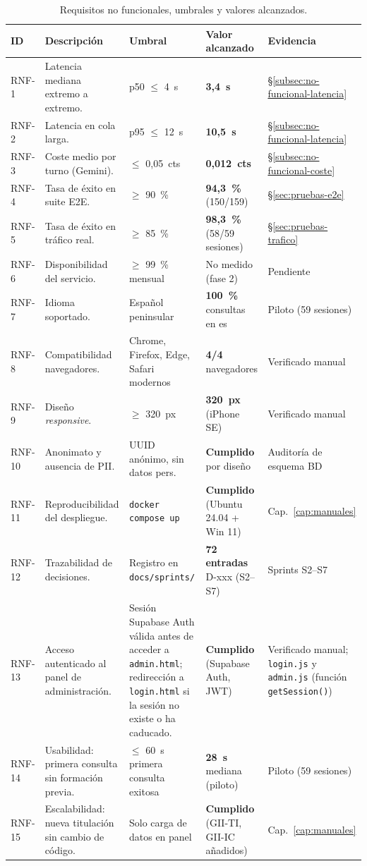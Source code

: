 \begin{table}[hbtp]
\centering
\small
\caption{Requisitos no funcionales, umbrales y valores alcanzados.}\label{tab:rnf}
\begin{tabular}{|p{1.0cm}|p{3.6cm}|p{3.2cm}|p{2.2cm}|p{2.4cm}|}
\hline
\textbf{ID} & \textbf{Descripción} & \textbf{Umbral} & \textbf{Valor alcanzado} & \textbf{Evidencia} \\ \hline
RNF-1 & Latencia mediana extremo a extremo. & p50 $\leq$ 4~s & \textbf{3,4~s} & \S\ref{subsec:no-funcional-latencia} \\ \hline
RNF-2 & Latencia en cola larga. & p95 $\leq$ 12~s & \textbf{10,5~s} & \S\ref{subsec:no-funcional-latencia} \\ \hline
RNF-3 & Coste medio por turno (Gemini). & $\leq$ 0,05~cts & \textbf{0,012~cts} & \S\ref{subsec:no-funcional-coste} \\ \hline
RNF-4 & Tasa de éxito en suite E2E. & $\geq$ 90~\% & \textbf{94,3~\%} (150/159) & \S\ref{sec:pruebas-e2e} \\ \hline
RNF-5 & Tasa de éxito en tráfico real. & $\geq$ 85~\% & \textbf{98,3~\%} (58/59 sesiones) & \S\ref{sec:pruebas-trafico} \\ \hline
RNF-6 & Disponibilidad del servicio. & $\geq$ 99~\% mensual & No medido (fase 2) & Pendiente \\ \hline
RNF-7 & Idioma soportado. & Español peninsular & \textbf{100~\%} consultas en es & Piloto (59 sesiones) \\ \hline
RNF-8 & Compatibilidad navegadores. & Chrome, Firefox, Edge, Safari modernos & \textbf{4/4} navegadores & Verificado manual \\ \hline
RNF-9 & Diseño \textit{responsive}. & $\geq$ 320~px & \textbf{320~px} (iPhone SE) & Verificado manual \\ \hline
RNF-10 & Anonimato y ausencia de PII. & UUID anónimo, sin datos pers. & \textbf{Cumplido} por diseño & Auditoría de esquema BD \\ \hline
RNF-11 & Reproducibilidad del despliegue. & \texttt{docker compose up} & \textbf{Cumplido} (Ubuntu 24.04 + Win 11) & Cap.~\ref{cap:manuales} \\ \hline
RNF-12 & Trazabilidad de decisiones. & Registro en \texttt{docs/sprints/} & \textbf{72 entradas} D-xxx (S2--S7) & Sprints S2--S7 \\ \hline
RNF-13 & Acceso autenticado al panel de administraci\'on. & Sesi\'on Supabase Auth v\'alida antes de acceder a \texttt{admin.html}; redirecci\'on a \texttt{login.html} si la sesi\'on no existe o ha caducado. & \textbf{Cumplido} (Supabase Auth, JWT) & Verificado manual; \texttt{login.js} y \texttt{admin.js} (funci\'on \texttt{getSession()}) \\ \hline
RNF-14 & Usabilidad: primera consulta sin formación previa. & $\leq$ 60~s primera consulta exitosa & \textbf{28~s} mediana (piloto) & Piloto (59 sesiones) \\ \hline
RNF-15 & Escalabilidad: nueva titulación sin cambio de código. & Solo carga de datos en panel & \textbf{Cumplido} (GII-TI, GII-IC añadidos) & Cap.~\ref{cap:manuales} \\ \hline
\end{tabular}
\end{table}

